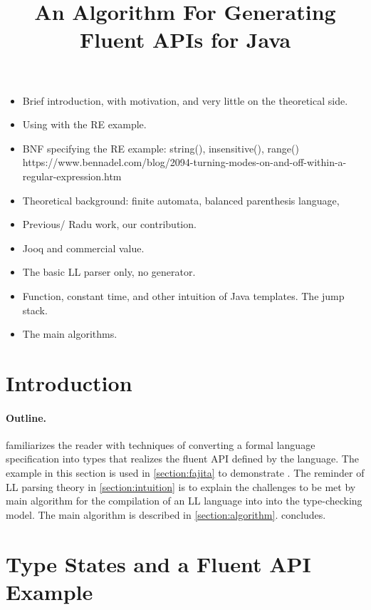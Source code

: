\documentclass[nonatbib,preprint,numbers]{sigplanconf}
\title
{%
An Algorithm For Generating Fluent APIs for  Java 
}
\begin{document}
\maketitle
\begin{itemize}
    \item Brief introduction, with motivation, and very little on the theoretical side.
    \item Using \Fajita with the RE example.
    \item BNF specifying the RE example: string(), insensitive(), range()
      https://www.bennadel.com/blog/2094-turning-modes-on-and-off-within-a-regular-expression.htm
    \item Theoretical background: finite automata, balanced parenthesis language, 
    \item Previous/ Radu work, our contribution. 
    \item Jooq and commercial value.
    \item The basic LL parser only, no generator.
    \item Function, constant time, and other intuition of Java templates. The jump stack.
    \item The main algorithms.
\end{itemize}

\begin{abstract}

\end{abstract}

\section{Introduction}


\paragraph{Outline.}  familiarizes the reader with
techniques of converting a formal language specification into \Java types that
realizes the fluent API defined by the language. The example in this section is
used in \cref{section:fajita} to demonstrate \Fajita.  The reminder of LL
parsing theory in \cref{section:intuition} is to explain the challenges to be
met by main algorithm for the compilation of an LL language into into the \Java
type-checking model.  The main algorithm is described in
\cref{section:algorithm}.   concludes.

\section{Type States and a Fluent API Example}
\label{section:example}

\end{document}
